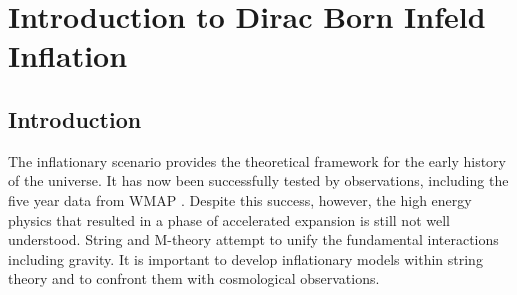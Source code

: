 \renewcommand{\CVSrevision}{\version$Id: dbi-intro.tex,v 1.47 2009/10/05 15:52:09 ith Exp $}
\chapter{Introduction to Dirac Born Infeld Inflation}
\label{ch:dbi-intro}

\section{Introduction}
% 
\label{sec:dbi-intro}


The inflationary scenario provides the 
theoretical framework for the early history 
of the universe. It has now been successfully tested by observations, 
including the five year data from WMAP
\cite{Komatsu:2008hk}. Despite this success, however, the high energy 
physics that resulted in a phase of accelerated expansion is still 
not well understood. String and M-theory attempt to unify the fundamental
interactions 
including gravity. It is important to 
develop inflationary models within string theory and to confront them with 
cosmological observations. 
 

